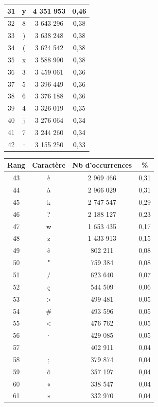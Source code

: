 \documentclass[a4paper,12pt,titlepage]{report}
\begin{document}
\begin{table}[h!]
\begin{tabular}{|c|c|c|c|}
\hline
31 & y &  4 351 953 & 0,46 \\
\hline
32 & 8 &  3 643 296 & 0,38 \\
\hline
33 & ) &  3 638 248 & 0,38 \\
\hline
34 & ( &  3 624 542 & 0,38 \\
\hline
35 & x &  3 588 990 & 0,38 \\
\hline
36 & 3 &  3 459 061 & 0,36 \\
\hline
37 & 5 &  3 396 449 & 0,36 \\
\hline
38 & 6 &  3 376 188 & 0,36 \\
\hline
39 & 4 &  3 326 019 & 0,35 \\ 
\hline
40 & j &  3 276 064 & 0,34 \\
\hline
41 & 7 &  3 244 260 & 0,34 \\
\hline
42 & : &  3 155 250 & 0,33 \\
\hline
\end{tabular}
\begin{tabular}{|c|c|c|c|}
\hline
\textbf{Rang} & \textbf{Caractère} & \textbf{Nb d'occurrences} & \textbf{\%} \\
\hline
43 & è &  2 969 466 & 0,31 \\
\hline
44 & à &  2 966 029 & 0,31 \\
\hline
45 & k &  2 747 547 & 0,29 \\
\hline
46 & ? &  2 188 127 & 0,23 \\
\hline
47 & w &  1 653 435 & 0,17 \\
\hline
48 & z &  1 433 913 & 0,15 \\
\hline
49 & ê &	802 211 & 0,08 \\
\hline
50 & " &	759 384 & 0,08 \\
\hline
51 & / &	623 640 & 0,07 \\
\hline
52 & ç &	544 509 & 0,06 \\
\hline
53 & > &	499 481 & 0,05 \\
\hline
54 &\# &	493 596 & 0,05 \\
\hline
55 & < & 	476 762 & 0,05 \\
\hline
56 & · &	429 085 & 0,05 \\
\hline
57 &   &	402 911 & 0,04 \\
\hline
58 & ; &	379 874 & 0,04 \\
\hline
59 & ô &	357 197 & 0,04 \\
\hline
60 & « & 	338 547 & 0,04 \\
\hline
61 & » &	332 970 & 0,04 \\

\end{tabular}
\end{table}
\end{document}
